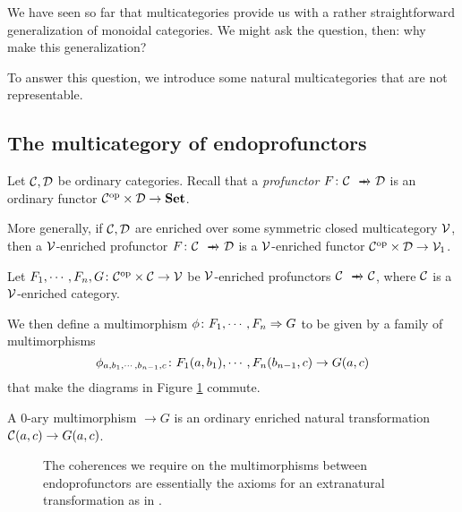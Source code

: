 \documentclass{article}
\begin{document}
We have seen so far that multicategories provide us with a rather straightforward generalization of monoidal categories.  
We might ask the question, then: why make this generalization? 

To answer this question, we introduce some natural multicategories that are not representable.

\subsection{The multicategory of endoprofunctors}
\label{SecEndoprofunctors}

Let ${\mathcal{C}},{\mathcal{D}}$ be ordinary categories.  
Recall that a \emph{profunctor} $F \from \C \pto \D$ is an ordinary functor ${\mathcal{C}}^{\mathrm{op}} \times {\mathcal{D}}\to{\normalfont\textbf{Set}}$.

More generally, if ${\mathcal{C}},{\mathcal{D}}$ are enriched over some symmetric closed multicategory ${\mathcal{V}}$, then a ${\mathcal{V}}$-enriched profunctor $F \from \C \pto \D$ is a ${\mathcal{V}}$-enriched functor ${\mathcal{C}}^{\mathrm{op}}\times{\mathcal{D}}\to{\mathcal{V}}_1$.

Let $F_1,\cdots,F_n,G \colon {\mathcal{C}}^{\mathrm{op}} \times {\mathcal{C}} \to {\mathcal{V}}$ be ${\mathcal{V}}$-enriched profunctors $\C\pto \C$, where ${\mathcal{C}}$ is a ${\mathcal{V}}$-enriched category.

We then define a multimorphism $\phi\colon F_1,\cdots,F_n \Rightarrow G$ to be given by a family of multimorphisms
\[
  \phi_{a,b_1,\cdots,b_{n-1},c} \colon F_1(a,b_1),\cdots,F_n(b_{n-1},c) \to G(a,c)
  \]
that make the diagrams in Figure \ref{FigExtranatural} commute.

A $0$-ary multimorphism $\to G$ is an ordinary enriched natural transformation ${\mathcal{C}}(a,c) \to G(a,c)$.
\begin{figure}
  \caption{The coherences we require on the multimorphisms between endoprofunctors are essentially the axioms for an extranatural transformation as in \cite{ExtranaturalTransformations}.}
  \label{FigExtranatural}
\end{figure}
\end{document}
